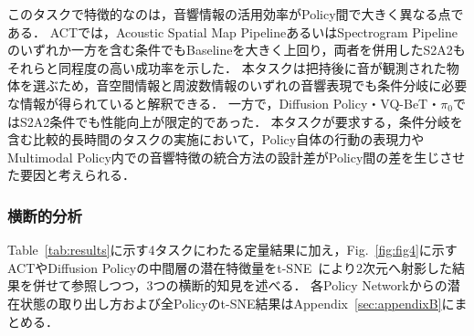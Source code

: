 \documentclass{article}
\begin{document}
	このタスクで特徴的なのは，音響情報の活用効率がPolicy間で大きく異なる点である．
	ACTでは，Acoustic Spatial Map PipelineあるいはSpectrogram Pipelineのいずれか一方を含む条件でもBaselineを大きく上回り，両者を併用したS2A2もそれらと同程度の高い成功率を示した．
	本タスクは把持後に音が観測された物体を選ぶため，音空間情報と周波数情報のいずれの音響表現でも条件分岐に必要な情報が得られていると解釈できる．
	一方で，Diffusion Policy・VQ-BeT・$\pi_0$ではS2A2条件でも性能向上が限定的であった．
	本タスクが要求する，条件分岐を含む比較的長時間のタスクの実施において，Policy自体の行動の表現力やMultimodal Policy内での音響特徴の統合方法の設計差がPolicy間の差を生じさせた要因と考えられる．








\subsubsection{横断的分析}
\label{sec:cross_analysis}
	Table~\ref{tab:results}に示す4タスクにわたる定量結果に加え，Fig.~\ref{fig:fig4}に示すACTやDiffusion Policyの中間層の潜在特徴量をt-SNE~\citep{vandermaaten2008tsne}により2次元へ射影した結果を併せて参照しつつ，3つの横断的知見を述べる．
	各Policy Networkからの潜在状態の取り出し方および全Policyのt-SNE結果はAppendix~\ref{sec:appendixB}にまとめる．
\end{document}
